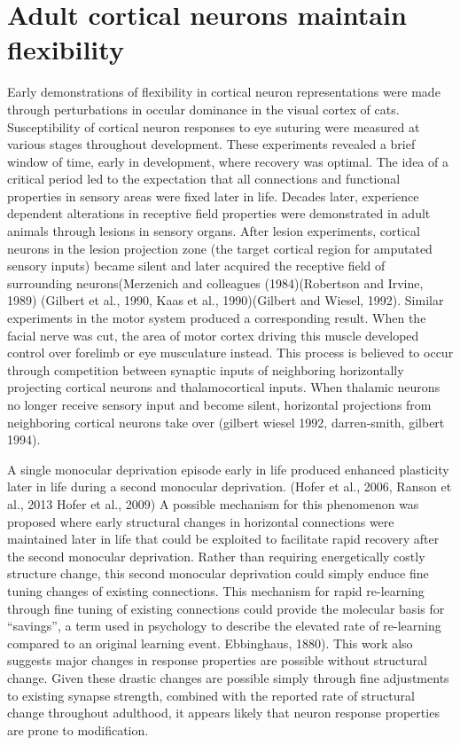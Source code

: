 \section{Adult cortical neurons maintain flexibility}
Early demonstrations of flexibility in cortical neuron representations were made through perturbations in occular dominance in the visual cortex of cats. Susceptibility of cortical neuron responses to eye suturing were measured at various stages throughout development. These experiments revealed a brief window of time, early in development, where recovery was optimal. The idea of a critical period led to the expectation that all connections and functional properties in sensory areas were fixed later in life.  Decades later, experience dependent alterations in receptive field properties were demonstrated in adult animals through lesions in sensory organs. After lesion experiments, cortical neurons in the lesion projection zone (the target cortical region for amputated sensory inputs) became silent and later acquired the receptive field of surrounding neurons(Merzenich and colleagues (1984)(Robertson and Irvine, 1989)  (Gilbert et al., 1990, Kaas et al., 1990)(Gilbert and Wiesel, 1992). Similar experiments in the motor system produced a corresponding result. When the facial nerve was cut, the area of motor cortex driving this muscle developed control over forelimb or eye musculature instead. This process is believed to occur through competition between synaptic inputs of neighboring horizontally projecting cortical neurons and thalamocortical inputs. When thalamic neurons no longer receive sensory input and become silent, horizontal projections from neighboring cortical neurons take over (gilbert wiesel 1992, darren-smith, gilbert 1994). 

\bigskip

A single monocular deprivation episode early in life produced enhanced plasticity later in life during a second monocular deprivation. (Hofer et al., 2006, Ranson et al., 2013 Hofer et al., 2009) A possible mechanism for this phenomenon was proposed where early structural changes in horizontal connections were maintained later in life that could be exploited to facilitate rapid recovery after the second monocular deprivation. Rather than requiring energetically costly structure change, this second monocular deprivation could simply enduce fine tuning changes of existing connections. This mechanism for rapid re-learning through fine tuning of existing connections could provide the molecular basis for “savings”, a term used in psychology to describe the elevated rate of re-learning compared to an original learning event. Ebbinghaus, 1880). This work also suggests major changes in response properties are possible without structural change. Given these drastic changes are possible simply through fine adjustments to existing synapse strength, combined with the reported rate of structural change throughout adulthood, it appears likely that neuron response properties are prone to modification.

